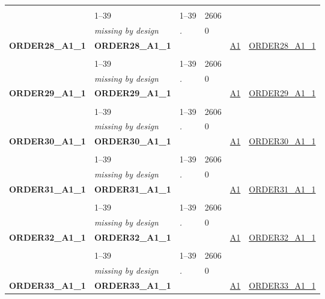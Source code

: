 \begin{longtable}{| L{2.45cm} | L{6cm} | C{1.5cm} | R{1cm} | C{2.25cm} | C{2.25cm} |}
   &  &  &  &  &  \\ 
   & 1--39 & 1--39 & 2606 &  &  \\ 
   & \textit{missing by design} & \textit{.} & 0 &  &  \\ 
   \midrule
\textbf{ORDER28\_A1\_1}\label{var:ORDER28:A1:1} & \textbf{ORDER28\_A1\_1} &  &  & \hyperref[A1]{A1} & \hyperref[var:suf:ORDER28:A1:1]{ORDER28\_A1\_1} \\ 
   &  &  &  &  &  \\ 
   & 1--39 & 1--39 & 2606 &  &  \\ 
   & \textit{missing by design} & \textit{.} & 0 &  &  \\ 
   \midrule
\textbf{ORDER29\_A1\_1}\label{var:ORDER29:A1:1} & \textbf{ORDER29\_A1\_1} &  &  & \hyperref[A1]{A1} & \hyperref[var:suf:ORDER29:A1:1]{ORDER29\_A1\_1} \\ 
   &  &  &  &  &  \\ 
   & 1--39 & 1--39 & 2606 &  &  \\ 
   & \textit{missing by design} & \textit{.} & 0 &  &  \\ 
   \midrule
\textbf{ORDER30\_A1\_1}\label{var:ORDER30:A1:1} & \textbf{ORDER30\_A1\_1} &  &  & \hyperref[A1]{A1} & \hyperref[var:suf:ORDER30:A1:1]{ORDER30\_A1\_1} \\ 
   &  &  &  &  &  \\ 
   & 1--39 & 1--39 & 2606 &  &  \\ 
   & \textit{missing by design} & \textit{.} & 0 &  &  \\ 
   \midrule
\textbf{ORDER31\_A1\_1}\label{var:ORDER31:A1:1} & \textbf{ORDER31\_A1\_1} &  &  & \hyperref[A1]{A1} & \hyperref[var:suf:ORDER31:A1:1]{ORDER31\_A1\_1} \\ 
   &  &  &  &  &  \\ 
   & 1--39 & 1--39 & 2606 &  &  \\ 
   & \textit{missing by design} & \textit{.} & 0 &  &  \\ 
   \midrule
\textbf{ORDER32\_A1\_1}\label{var:ORDER32:A1:1} & \textbf{ORDER32\_A1\_1} &  &  & \hyperref[A1]{A1} & \hyperref[var:suf:ORDER32:A1:1]{ORDER32\_A1\_1} \\ 
   &  &  &  &  &  \\ 
   & 1--39 & 1--39 & 2606 &  &  \\ 
   & \textit{missing by design} & \textit{.} & 0 &  &  \\ 
   \midrule
\textbf{ORDER33\_A1\_1}\label{var:ORDER33:A1:1} & \textbf{ORDER33\_A1\_1} &  &  & \hyperref[A1]{A1} & \hyperref[var:suf:ORDER33:A1:1]{ORDER33\_A1\_1} \\ 

\end{longtable}
